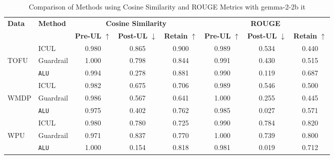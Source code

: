 \begin{table*}[]
    \centering
    \caption{Comparison of Methods using Cosine Similarity and ROUGE Metrics with gemma-2-2b it}
    \begin{tabular}{llccc|ccc}
        \toprule
        \textbf{Data}&\textbf{Method} & \multicolumn{3}{c}{\textbf{Cosine Similarity}} & \multicolumn{3}{c}{\textbf{ROUGE}} \\
        \cmidrule(lr){3-5} \cmidrule(lr){6-8}
         & & \textbf{Pre-UL} $\uparrow$ & \textbf{Post-UL} $\downarrow$ & \textbf{Retain} $\uparrow$ & \textbf{Pre-UL} $\uparrow$ & \textbf{Post-UL} $\downarrow$ & \textbf{Retain} $\uparrow$ \\
        \midrule
        &ICUL & 0.980 & 0.865 & 0.900 & 0.989 & 0.534 & 0.440 \\
        TOFU &Guardrail & 1.000 & 0.798 & 0.844 & 0.991 & 0.430 & 0.515 \\
        &\texttt{ALU}  & 0.994 & 0.278 & 0.881 & 0.990 & 0.119 & 0.687 \\
        \midrule
        &ICUL  & 0.982 & 0.675 & 0.706 & 0.989 & 0.546 & 0.500 \\
        WMDP & Guardrail  & 0.986  & 0.567 & 0.641 & 1.000 & 0.255 & 0.445 \\
        &\texttt{ALU} & 0.975  & 0.402 & 0.762 & 0.985 & 0.027 & 0.571 \\
        \midrule
        &ICUL  & 0.980 & 0.780 & 0.725 & 0.990 & 0.784 & 0.820 \\
        WPU &Guardrail & 0.971 & 0.837 & 0.770 & 1.000 & 0.739 & 0.800 \\
        &\texttt{ALU} & 1.000 & 0.154 & 0.818 & 0.981 & 0.019 & 0.712 \\
        
        \bottomrule
    \end{tabular}
\label{tab:t21}    
\end{table*}

